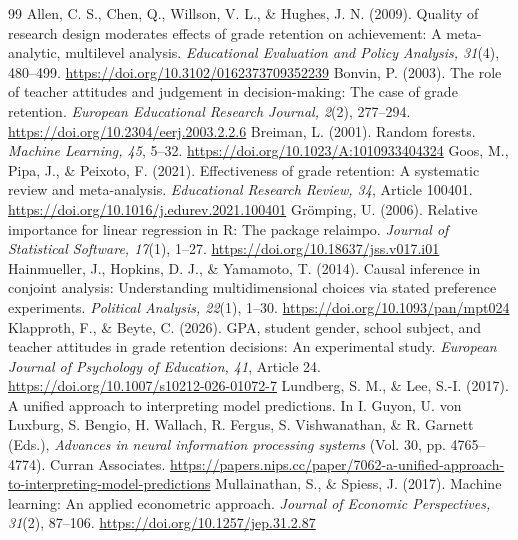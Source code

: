 \begin{thebibliography}{99}\small{}\setlength{\itemsep}{5pt}
 \color{revised} Allen, C. S., Chen, Q., Willson, V. L., \& Hughes, J. N. (2009). Quality of research design moderates effects of grade retention on achievement: A meta-analytic, multilevel analysis. \textit{Educational Evaluation and Policy Analysis, 31}(4), 480--499. \url{https://doi.org/10.3102/0162373709352239}
 \color{revised} Bonvin, P. (2003). The role of teacher attitudes and judgement in decision-making: The case of grade retention. \textit{European Educational Research Journal, 2}(2), 277--294. \url{https://doi.org/10.2304/eerj.2003.2.2.6}
 \color{revised} Breiman, L. (2001). Random forests. \textit{Machine Learning, 45}, 5--32. \url{https://doi.org/10.1023/A:1010933404324}
 \color{revised} Goos, M., Pipa, J., \& Peixoto, F. (2021). Effectiveness of grade retention: A systematic review and meta-analysis. \textit{Educational Research Review, 34}, Article 100401. \url{https://doi.org/10.1016/j.edurev.2021.100401}
 \color{added} Gr\"omping, U. (2006). Relative importance for linear regression in R: The package relaimpo. \textit{Journal of Statistical Software, 17}(1), 1--27. \url{https://doi.org/10.18637/jss.v017.i01}
 \color{revised} Hainmueller, J., Hopkins, D. J., \& Yamamoto, T. (2014). Causal inference in conjoint analysis: Understanding multidimensional choices via stated preference experiments. \textit{Political Analysis, 22}(1), 1--30. \url{https://doi.org/10.1093/pan/mpt024}
 \color{revised} Klapproth, F., \& Beyte, C. (2026). GPA, student gender, school subject, and teacher attitudes in grade retention decisions: An experimental study. \textit{European Journal of Psychology of Education, 41}, Article 24. \url{https://doi.org/10.1007/s10212-026-01072-7}
 \color{revised} Lundberg, S. M., \& Lee, S.-I. (2017). A unified approach to interpreting model predictions. In I. Guyon, U. von Luxburg, S. Bengio, H. Wallach, R. Fergus, S. Vishwanathan, \& R. Garnett (Eds.), \textit{Advances in neural information processing systems} (Vol. 30, pp. 4765--4774). Curran Associates. \url{https://papers.nips.cc/paper/7062-a-unified-approach-to-interpreting-model-predictions}
 \color{revised} Mullainathan, S., \& Spiess, J. (2017). Machine learning: An applied econometric approach. \textit{Journal of Economic Perspectives, 31}(2), 87--106. \url{https://doi.org/10.1257/jep.31.2.87}

\end{thebibliography}
